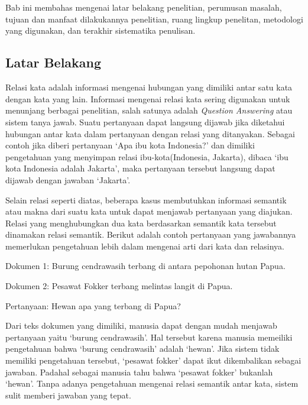 \chapter{\babSatu}
Bab ini membahas mengenai latar belakang penelitian, perumusan masalah, tujuan dan manfaat dilakukannya penelitian, ruang lingkup penelitan, metodologi yang digunakan, dan terakhir sistematika penulisan. 

%
\section{Latar Belakang}
Relasi kata adalah informasi mengenai hubungan yang dimiliki antar satu kata dengan kata yang lain. Informasi mengenai relasi kata sering digunakan untuk menunjang berbagai penelitian, salah satunya adalah \textit{Question Answering} atau sistem tanya jawab. Suatu pertanyaan dapat langsung dijawab jika diketahui hubungan antar kata dalam pertanyaan dengan relasi yang ditanyakan. Sebagai contoh jika diberi pertanyaan `Apa ibu kota Indonesia?' dan dimiliki pengetahuan yang menyimpan relasi ibu-kota(Indonesia, Jakarta), dibaca `ibu kota Indonesia adalah Jakarta', maka pertanyaan tersebut langsung dapat dijawab dengan jawaban `Jakarta'.

Selain relasi seperti diatas, beberapa kasus membutuhkan informasi semantik atau makna dari suatu kata untuk dapat menjawab pertanyaan yang diajukan. Relasi yang menghubungkan dua kata berdasarkan semantik kata tersebut dinamakan relasi semantik. Berikut adalah contoh pertanyaan yang jawabannya memerlukan pengetahuan lebih dalam mengenai arti dari kata dan relasinya.

Dokumen 1: Burung cendrawasih terbang di antara pepohonan hutan Papua.

Dokumen 2: Pesawat Fokker terbang melintas langit di Papua.

Pertanyaan: Hewan apa yang terbang di Papua?

\noindent Dari teks dokumen yang dimiliki, manusia dapat dengan mudah menjawab pertanyaan yaitu `burung cendrawasih'. Hal tersebut karena manusia memeiliki pengetahuan bahwa `burung cendrawasih' adalah `hewan'. Jika sistem tidak memiliki pengetahuan tersebut, `pesawat fokker' dapat ikut dikembalikan sebagai jawaban. Padahal sebagai manusia tahu bahwa `pesawat fokker' bukanlah `hewan'. Tanpa adanya pengetahuan mengenai relasi semantik antar kata, sistem sulit memberi jawaban yang tepat.


